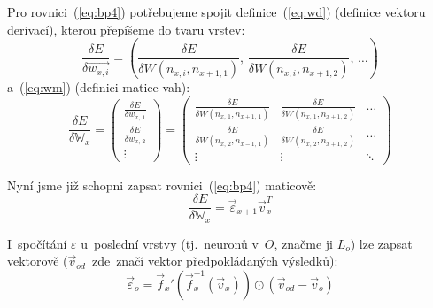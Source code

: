 \documentclass[12pt]{report}			%
\newcommand{\W}{\mathbb{W}}
\begin{document}
					Pro rovnici~(\ref{eq:bp4}) potřebujeme spojit definice~(\ref{eq:wd}) (definice vektoru derivací), kterou přepíšeme do tvaru vrstev:
					\begin{equation} \frac{\delta E}{\delta\vec{w_{x,i}}} = \left(\frac{\delta E}{\delta W\left(n_{x, i}, n_{x+1,1}\right)},\,\frac{\delta E}{\delta W\left(n_{x, i}, n_{x+1,2}\right)},\,\ldots\right) \end{equation}
					a~(\ref{eq:wm}) (definici matice vah):
					\begin{equation}
						\frac{\delta E}{\delta \W_x} = \begin{pmatrix}
							\frac{\delta E}{\delta w_{x,\,1}} \\
							\frac{\delta E}{\delta w_{x,\,2}} \\
							\vdots
						\end{pmatrix} = \begin{pmatrix}
							\frac{\delta E}{\delta W\left(n_{x,\,1}, n_{x+1,\,1}\right)} & \frac{\delta E}{\delta W\left(n_{x,\,1}, n_{x+1,\,2}\right)} & \ldots \\
							\frac{\delta E}{\delta W\left(n_{x,\,2}, n_{x-1,\,1}\right)} & \frac{\delta E}{\delta W\left(n_{x,\,2}, n_{x+1,\,2}\right)} & \ldots \\
							\vdots & \vdots & \ddots
						\end{pmatrix}
						\label{eq:wdm}
					\end{equation}
					
					Nyní jsme již schopni zapsat rovnici~(\ref{eq:bp4}) maticově:
					\begin{equation} \frac{\delta E}{\delta \W_x} = \vec{\varepsilon}_{x+1} \vec{v}_x^T \label{eq:bpab2} \end{equation}

 					I~spočítání $\varepsilon$ u~poslední vrstvy (tj.~neuronů v~$O$, značme ji $L_o$) lze zapsat vektorově ($\vec{v}_{od}$~zde~značí vektor předpokládaných výsledků):
					\begin{equation} \vec{\varepsilon}_o = \vec{f}_x'\left(\vec{f}_x^{-1}(\vec{v}_x)\right) \odot \left(\vec{v}_{od} - \vec{v}_o\right) \label{eq:bpab3} \end{equation}
					
\end{document}
